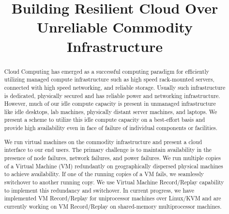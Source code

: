 \documentclass[preprint,9pt]{sigplanconf}
\begin{document}


\title{Building Resilient Cloud Over Unreliable Commodity Infrastructure}

\maketitle

\begin{abstract}
Cloud Computing has emerged as a successful computing paradigm for efficiently utilizing managed compute infrastructure such as high speed rack-mounted servers, connected with high speed networking, and reliable storage. Usually such infrastructure is dedicated, physically secured and has reliable power and networking infrastructure. However, much of our idle compute capacity is present in unmanaged infrastructure like idle desktops, lab machines, physically distant server machines, and laptops. We present a scheme to utilize this idle compute capacity on a best-effort basis and provide high availability even in face of failure of individual components or facilities.

We run virtual machines on the commodity infrastructure and present a cloud interface to our end users. The primary challenge is to maintain availability in the presence of node failures, network failures, and power failures. We run multiple copies of a Virtual Machine (VM) redundantly on geographically dispersed physical machines to achieve availability. If one of the running copies of a VM fails, we seamlessly switchover to another running copy. We use Virtual Machine Record/Replay capability to implement this redundancy and switchover. In current progress, we have implemented VM Record/Replay for uniprocessor machines over Linux/KVM and are currently working on VM Record/Replay on shared-memory multiprocessor machines.
\end{abstract}


\end{document}
